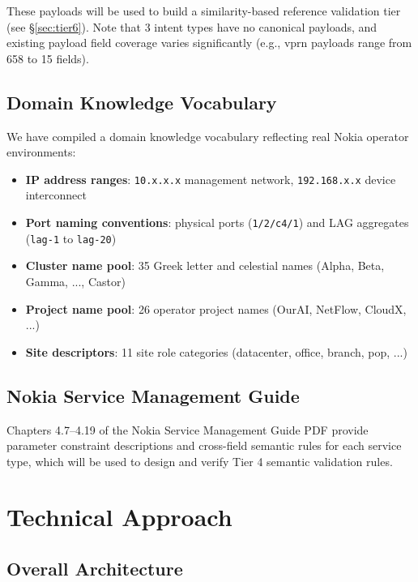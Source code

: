 \documentclass[12pt, a4paper]{article}
\begin{document}
\noindent
These payloads will be used to build a similarity-based reference validation tier (see \S\ref{sec:tier6}). Note that 3 intent types have no canonical payloads, and existing payload field coverage varies significantly (e.g., vprn payloads range from 658 to 15 fields).

\subsection{Domain Knowledge Vocabulary}

We have compiled a domain knowledge vocabulary reflecting real Nokia operator environments:

\begin{itemize}
  \item \textbf{IP address ranges}: \texttt{10.x.x.x} management network, \texttt{192.168.x.x} device interconnect
  \item \textbf{Port naming conventions}: physical ports (\texttt{1/2/c4/1}) and LAG aggregates (\texttt{lag-1} to \texttt{lag-20})
  \item \textbf{Cluster name pool}: 35 Greek letter and celestial names (Alpha, Beta, Gamma, ..., Castor)
  \item \textbf{Project name pool}: 26 operator project names (OurAI, NetFlow, CloudX, ...)
  \item \textbf{Site descriptors}: 11 site role categories (datacenter, office, branch, pop, ...)
\end{itemize}

\subsection{Nokia Service Management Guide}

Chapters 4.7--4.19 of the Nokia Service Management Guide PDF provide parameter constraint descriptions and cross-field semantic rules for each service type, which will be used to design and verify Tier 4 semantic validation rules.

\section{Technical Approach}
\label{sec:approach}

\subsection{Overall Architecture}
\end{document}
